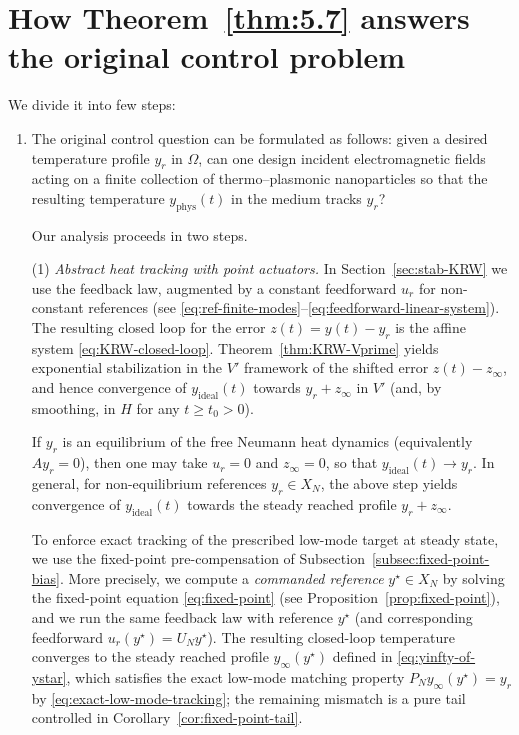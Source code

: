 \documentclass[11pt,a4paper]{article}
\numberwithin{equation}{section}
\theoremstyle{definition}
\newcommand{\1}{\mathbbm{1}}
\begin{document}
\section{How Theorem~\ref{thm:5.7} answers the original control problem}
\label{rem:link-original-problem}
\noindent
We divide it into few steps:

\begin{enumerate}
\item The original control question can be formulated as follows: given a desired
temperature profile $y_r$ in $\Omega$, can one design incident electromagnetic
fields acting on a finite collection of thermo--plasmonic nanoparticles so that
the resulting temperature $y_{\mathrm{phys}}(t)$ in the medium tracks $y_r$?

Our analysis proceeds in two steps.

\smallskip
\noindent
(1) \emph{Abstract heat tracking with point actuators.}
In Section~\ref{sec:stab-KRW} we use the feedback law, augmented by a constant feedforward
$u_r$ for non-constant references (see \eqref{eq:ref-finite-modes}--\eqref{eq:feedforward-linear-system}).
The resulting closed loop for the error $z(t)=y(t)-y_r$ is the affine system \eqref{eq:KRW-closed-loop}.
Theorem~\ref{thm:KRW-Vprime} yields exponential stabilization in the $V'$ framework of the shifted error
$z(t)-z_\infty$, and hence convergence of $y_{\mathrm{ideal}}(t)$ towards $y_r+z_\infty$ in $V'$ (and, by smoothing,
in $H$ for any $t\ge t_0>0$).

If $y_r$ is an equilibrium of the free Neumann heat dynamics (equivalently $Ay_r=0$),
then one may take $u_r=0$ and $z_\infty=0$, so that $y_{\mathrm{ideal}}(t)\to y_r$.
In general, for non-equilibrium references $y_r\in X_N$, the above step yields convergence of
$y_{\mathrm{ideal}}(t)$ towards the steady reached profile $y_r+z_\infty$.

To enforce exact tracking of the prescribed low-mode target at steady state, we use the fixed-point
pre-compensation of Subsection~\ref{subsec:fixed-point-bias}. More precisely, we compute a
\emph{commanded reference} $y^\star\in X_N$ by solving the fixed-point equation
\eqref{eq:fixed-point} (see Proposition~\ref{prop:fixed-point}), and we run the same feedback law with reference
$y^\star$ (and corresponding feedforward $u_r(y^\star)=U_Ny^\star$). The resulting closed-loop temperature
converges to the steady reached profile $y_\infty(y^\star)$ defined in \eqref{eq:yinfty-of-ystar}, which satisfies
the exact low-mode matching property $P_Ny_\infty(y^\star)=y_r$ by \eqref{eq:exact-low-mode-tracking}; the
remaining mismatch is a pure tail controlled in Corollary~\ref{cor:fixed-point-tail}.


\end{enumerate}
\end{document}
